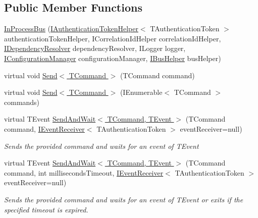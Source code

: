 \subsection*{Public Member Functions}
\begin{DoxyCompactItemize}
\item 
\hyperlink{classCqrs_1_1Bus_1_1InProcessBus_a64bea583461562783d97cd98ff0dff91}{In\+Process\+Bus} (\hyperlink{interfaceCqrs_1_1Authentication_1_1IAuthenticationTokenHelper}{I\+Authentication\+Token\+Helper}$<$ T\+Authentication\+Token $>$ authentication\+Token\+Helper, I\+Correlation\+Id\+Helper correlation\+Id\+Helper, \hyperlink{interfaceCqrs_1_1Configuration_1_1IDependencyResolver}{I\+Dependency\+Resolver} dependency\+Resolver, I\+Logger logger, \hyperlink{interfaceCqrs_1_1Configuration_1_1IConfigurationManager}{I\+Configuration\+Manager} configuration\+Manager, \hyperlink{interfaceCqrs_1_1Bus_1_1IBusHelper}{I\+Bus\+Helper} bus\+Helper)
\item 
virtual void \hyperlink{classCqrs_1_1Bus_1_1InProcessBus_a6a074ef3663d2855875307b106fe4416}{Send$<$ T\+Command $>$} (T\+Command command)
\item 
virtual void \hyperlink{classCqrs_1_1Bus_1_1InProcessBus_ae5dae5f2445387280c974ec181167055}{Send$<$ T\+Command $>$} (I\+Enumerable$<$ T\+Command $>$ commands)
\item 
virtual T\+Event \hyperlink{classCqrs_1_1Bus_1_1InProcessBus_a506d617dc7ec3838791a91e09b73b8ce}{Send\+And\+Wait$<$ T\+Command, T\+Event $>$} (T\+Command command, \hyperlink{interfaceCqrs_1_1Events_1_1IEventReceiver}{I\+Event\+Receiver}$<$ T\+Authentication\+Token $>$ event\+Receiver=null)
\begin{DoxyCompactList}\small\item\em Sends the provided {\itshape command}  and waits for an event of {\itshape T\+Event}  \end{DoxyCompactList}\item 
virtual T\+Event \hyperlink{classCqrs_1_1Bus_1_1InProcessBus_a1b3540fe06b60cd601eaff4ea53f5465}{Send\+And\+Wait$<$ T\+Command, T\+Event $>$} (T\+Command command, int milliseconds\+Timeout, \hyperlink{interfaceCqrs_1_1Events_1_1IEventReceiver}{I\+Event\+Receiver}$<$ T\+Authentication\+Token $>$ event\+Receiver=null)
\begin{DoxyCompactList}\small\item\em Sends the provided {\itshape command}  and waits for an event of {\itshape T\+Event}  or exits if the specified timeout is expired. \end{DoxyCompactList}\item 

\end{DoxyCompactItemize}

